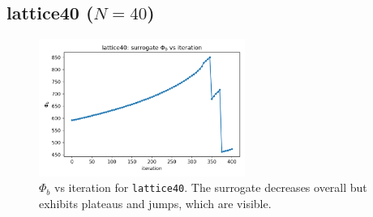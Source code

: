 \documentclass[11pt,a4paper]{article}
\numberwithin{equation}{section}
\newcommand{\phib}{\Phi_b}
\begin{document}
\subsection{lattice40 ($N{=}40$)}
\begin{figure}[h!]
\centering
\includegraphics[width=0.6\textwidth]{figures/lattice40_phib_vs_iter.png}
\caption{$\phib$ vs iteration for \texttt{lattice40}. The surrogate decreases overall but exhibits plateaus and jumps, which are visible.}
\label{fig:lattice40_iter}
\end{figure}
\end{document}
